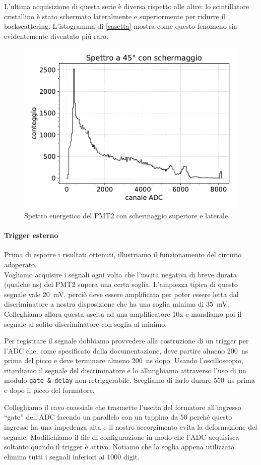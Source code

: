 L'ultima acquisizione di questa serie è diversa rispetto alle altre: lo scintillatore cristallino è stato schermato lateralmente e superiormente per ridurre il backscattering. L'istogramma di \autoref{casetta} mostra come questo fenomeno sia evidentemente diventato più raro.

\begin{figure}
\centering
\includegraphics[width=25 em]{45gs}
\caption{Spettro energetico del PMT2 con schermaggio superiore e laterale.}
\label{casetta}
\end{figure}

\paragraph{Trigger esterno} Prima di esporre i risultati ottenuti, illustriamo il funzionamento del circuito adoperato.\\
Vogliamo acquisire i segnali ogni volta che l'uscita negativa di breve durata (qualche \si{ns}) del PMT2 supera una certa soglia. L'ampiezza tipica di questo segnale vale \SI{20}{mV}, perciò deve essere amplificata per poter essere letta dal discriminatore a nostra disposizione che ha una soglia minima di \SI{35}{mV}. Colleghiamo allora questa uscita ad una amplificatore 10x 
e mandiamo poi il segnale al solito discriminatore con soglia al minimo.

Per registrare il segnale dobbiamo provvedere alla costruzione di un trigger per l'ADC che, come specificato dalla documentazione, deve partire almeno \SI{200}{ns} prima del picco e deve terminare almeno \SI{200}{ns} dopo. Usando l'oscilloscopio, ritardiamo il segnale del discriminatore e lo allunghiamo attraverso l'uso di un modulo \texttt{gate \& delay} non retriggerabile. Scegliamo di farlo durare \SI{550}{ns} prima e dopo il picco del formatore.

Colleghiamo il cavo coassiale che trasmette l'uscita del formatore all'ingresso ``gate'' dell'ADC facendo un parallelo con un tappino da \SI{50}{\Omega} perché questo ingresso ha una impedenza alta e il nostro accorgimento evita la deformazione del segnale.
Modifichiamo il file di configurazione in modo che l'ADC acquisisca soltanto quando il trigger è attivo. Notiamo che la soglia appena utilizzata elimina tutti i segnali inferiori ai 1000 digit. 
